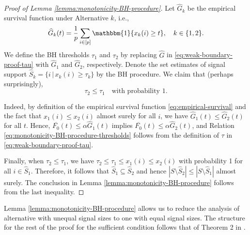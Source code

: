 \begin{proof}[Proof of Lemma \ref{lemma:monotonicity-BH-procedure}]
Let $\widehat{G}_k$ be the empirical survival function under Alternative $k$, i.e.,
\begin{equation} \label{eq:empirical-survival}
    \widehat{G}_k(t) = \frac{1}{p}\sum_{i\in[p]}\mathbbm{1}\{x_k(i) \ge t\}, \quad k\in\{1,2\}.
\end{equation}
We define the BH thresholds $\tau_1$ and $\tau_2$ by replacing $\widehat{G}$ in \eqref{eq:weak-boundary-proof-tau} with $\widehat{G}_1$ and $\widehat{G}_2$, respectively.
Denote the set estimates of signal support $\widehat{S}_k = \{i\,|\,x_k(i)\ge\tau_k\}$ by the BH procedure.
We claim that (perhaps surprisingly),
\begin{equation} \label{eq:monotonicity-BH-procedure-thresholds}
    \tau_2 \le \tau_1 \quad \text{with probability } 1.
\end{equation}

Indeed, by definition of the empirical survival function \eqref{eq:empirical-survival} and the fact that $x_1(i) \le x_2(i)$ almost surely for all $i$,  we have $\widehat{G}_1(t) \le \widehat{G}_2(t)$ for all $t$.
Hence, $\overline{F_0}(t)\le\alpha\widehat{G}_1(t)$ implies $\overline{F_0}(t)\le\alpha\widehat{G}_2(t)$, and Relation \eqref{eq:monotonicity-BH-procedure-thresholds} follows from the definition of $\tau$ in \eqref{eq:weak-boundary-proof-tau}.

Finally, when $\tau_2 \le \tau_1$, we have $\tau_2 \le \tau_1 \le x_1(i) \le x_2(i)$ with probability 1 for all $i\in\widehat{S}_1$.
Therefore, it follows that $\widehat{S}_1 \subseteq \widehat{S}_2$ and hence $|S\setminus\widehat{S}_2| \le |S\setminus\widehat{S}_1|$ almost surely. 
The conclusion in Lemma \ref{lemma:monotonicity-BH-procedure} follows from the last inequality.
\end{proof}

Lemma \ref{lemma:monotonicity-BH-procedure} allows us to reduce the analysis of alternative with unequal signal sizes to one with equal signal sizes. 
The structure for the rest of the proof for the sufficient condition follows that of Theorem 2 in \cite{arias2017distribution}. 


